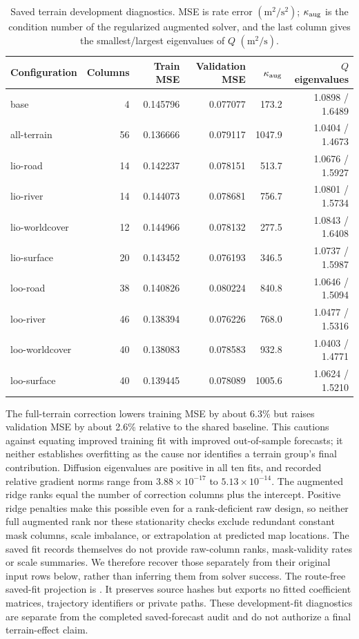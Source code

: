 \begin{table}[htbp]
\centering\footnotesize
\caption{Saved terrain development diagnostics. MSE is rate error
\((\mathrm{m}^2/\mathrm{s}^2)\); \(\kappa_{\rm aug}\) is the condition
number of the regularized augmented solver, and the last column gives the
smallest/largest eigenvalues of \(Q\) \((\mathrm{m}^2/\mathrm{s})\).}
\label{tab:terrain-fit-diagnostics}\hypertarget{tab:terrain-fit-diagnostics}{}
\begin{tabular}{lrrrrr}
\toprule
Configuration & Columns & Train MSE & Validation MSE & \(\kappa_{\rm aug}\) & \(Q\) eigenvalues\\
\midrule
base & 4 & 0.145796 & 0.077077 & 173.2 & 1.0898 / 1.6489\\
all-terrain & 56 & 0.136666 & 0.079117 & 1047.9 & 1.0404 / 1.4673\\
lio-road & 14 & 0.142237 & 0.078151 & 513.7 & 1.0676 / 1.5927\\
lio-river & 14 & 0.144073 & 0.078681 & 756.7 & 1.0801 / 1.5734\\
lio-worldcover & 12 & 0.144966 & 0.078132 & 277.5 & 1.0843 / 1.6408\\
lio-surface & 20 & 0.143452 & 0.076193 & 346.5 & 1.0737 / 1.5987\\
loo-road & 38 & 0.140826 & 0.080224 & 840.8 & 1.0646 / 1.5094\\
loo-river & 46 & 0.138394 & 0.076226 & 768.0 & 1.0477 / 1.5316\\
loo-worldcover & 40 & 0.138083 & 0.078583 & 932.8 & 1.0403 / 1.4771\\
loo-surface & 40 & 0.139445 & 0.078089 & 1005.6 & 1.0624 / 1.5210\\
\bottomrule
\end{tabular}
\end{table}

The full-terrain correction lowers training MSE by about 6.3\% but raises
validation MSE by about 2.6\% relative to the shared baseline. This cautions
against equating improved training fit with improved out-of-sample forecasts;
it neither establishes overfitting as the cause nor identifies a terrain
group's final contribution. Diffusion eigenvalues are positive in all ten
fits, and recorded relative gradient norms range from
\(3.88\times10^{-17}\) to \(5.13\times10^{-14}\). The augmented ridge ranks
equal the number of correction columns plus the intercept. Positive ridge
penalties make this possible even for a rank-deficient raw design, so neither
full augmented rank nor these stationarity checks exclude redundant constant
mask columns, scale imbalance, or extrapolation at predicted map locations.
The saved fit records themselves do not provide raw-column ranks, mask-validity
rates or scale summaries. We therefore recover those separately from their
original input rows below, rather than inferring them from solver success.
The route-free saved-fit projection is
. It preserves source hashes but
exports no fitted coefficient matrices, trajectory identifiers or private
paths. These development-fit diagnostics are separate from the completed
saved-forecast audit and do not authorize a final terrain-effect claim.

